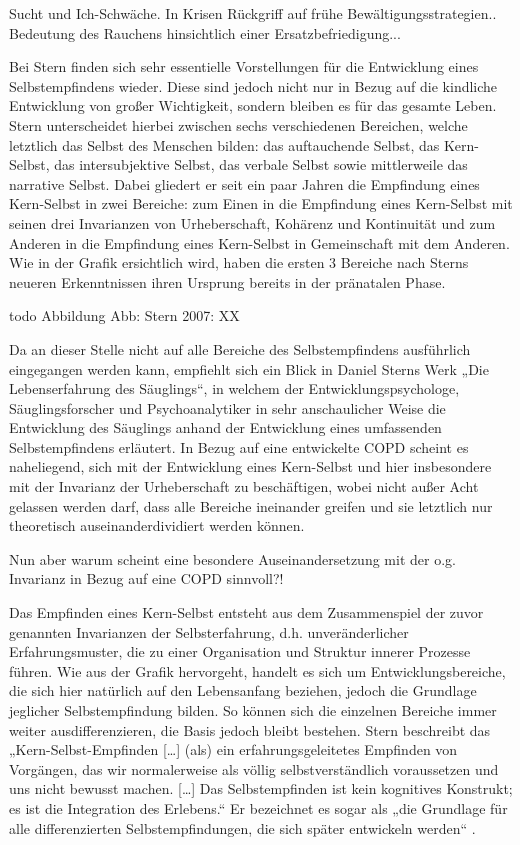 Sucht und Ich-Schwäche. In Krisen Rückgriff auf frühe Bewältigungsstrategien.. Bedeutung des Rauchens hinsichtlich einer Ersatzbefriedigung...

Bei Stern finden sich sehr essentielle Vorstellungen für die Entwicklung eines Selbstempfindens wieder. Diese sind jedoch nicht nur in Bezug auf die kindliche Entwicklung von großer Wichtigkeit, sondern bleiben es für das gesamte Leben. Stern unterscheidet hierbei zwischen sechs verschiedenen Bereichen, welche letztlich das Selbst des Menschen bilden: das auftauchende Selbst, das Kern-Selbst, das intersubjektive Selbst, das verbale Selbst sowie mittlerweile das narrative Selbst. Dabei gliedert er seit ein paar Jahren die Empfindung eines Kern-Selbst in zwei Bereiche: zum Einen in die Empfindung eines Kern-Selbst mit seinen drei Invarianzen von Urheberschaft, Kohärenz und Kontinuität und zum Anderen in die Empfindung eines Kern-Selbst in Gemeinschaft mit dem Anderen.  Wie in der Grafik ersichtlich wird, haben die ersten 3 Bereiche nach Sterns neueren Erkenntnissen ihren Ursprung bereits in der pränatalen Phase.

todo Abbildung 
Abb: Stern 2007: XX

Da an dieser Stelle nicht auf alle Bereiche des Selbstempfindens ausführlich eingegangen werden kann, empfiehlt sich ein Blick in Daniel Sterns Werk „Die Lebenserfahrung des Säuglings“, in welchem der Entwicklungspsychologe, Säuglingsforscher und Psychoanalytiker in sehr anschaulicher Weise die Entwicklung des Säuglings anhand der Entwicklung eines umfassenden Selbstempfindens erläutert.
In Bezug auf eine entwickelte COPD scheint es naheliegend, sich mit der Entwicklung eines Kern-Selbst und hier insbesondere mit der Invarianz der Urheberschaft zu beschäftigen, wobei nicht außer Acht gelassen werden darf, dass alle Bereiche ineinander greifen und sie letztlich nur theoretisch auseinanderdividiert werden können.

Nun aber warum scheint eine besondere Auseinandersetzung mit der o.g. Invarianz in Bezug auf eine COPD sinnvoll?!

Das Empfinden eines Kern-Selbst entsteht aus dem Zusammenspiel der zuvor genannten Invarianzen der Selbsterfahrung, d.h. unveränderlicher Erfahrungsmuster, die zu einer Organisation und Struktur innerer Prozesse führen. Wie aus der Grafik hervorgeht, handelt es sich um Entwicklungsbereiche, die sich hier natürlich auf den Lebensanfang beziehen, jedoch die Grundlage jeglicher Selbstempfindung bilden. So können sich die einzelnen Bereiche immer weiter ausdifferenzieren, die Basis jedoch bleibt bestehen. 
Stern beschreibt das „Kern-Selbst-Empfinden […] (als) ein erfahrungsgeleitetes Empfinden von Vorgängen, das wir normalerweise als völlig selbstverständlich voraussetzen und uns nicht bewusst machen. […] Das Selbstempfinden ist kein kognitives Konstrukt; es ist die Integration des Erlebens.“ \autocite[106f.]{stern2007} Er bezeichnet es sogar als „die Grundlage für alle differenzierten Selbstempfindungen, die sich später entwickeln werden“ \autocite[106f.]{stern2007}. 

